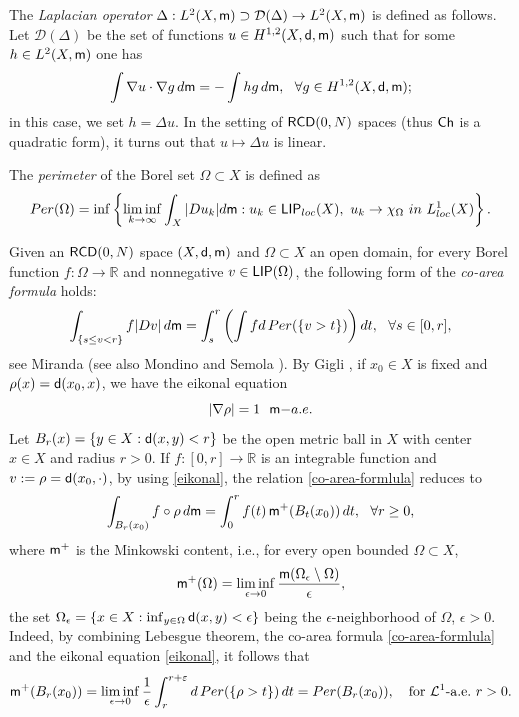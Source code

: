 \documentclass[11pt, reqno]{amsart}
\numberwithin{equation}{section}
\begin{document}
	The \textit{Laplacian operator} $\Delta:L^2(X,{\sf m})\supset \mathcal D(\Delta) \to L^2(X,{\sf m})$ is defined as follows. Let $\mathcal D(\Delta)$ be the set of functions $u\in H^{ 1,2}(X,{\sf d},{\sf m})$ such that for some $h\in L^2(X,{\sf m})$ one has 
	$$\int \nabla u \cdot \nabla g \, {\rm d}{\sf m}=-\int    hg \, {\rm d}{\sf m},\ \ \forall g\in H^{ 1,2}(X,{\sf d},{\sf m});$$ in this case, we set $h=\Delta u.$ In the setting of  ${\sf RCD}(0,N)$ spaces (thus ${\sf Ch}$ is a  quadratic form), it turns out that $u\mapsto \Delta u$ is linear. 
	
 The \textit{perimeter} of the Borel set $\Omega\subset X$ is defined as 
	$${\rm Per}(\Omega)=\inf\left\{\liminf_{k\to \infty} \int_X |D u_k| {\rm d} {\sf m}:u_k\in \mathsf{LIP}_{\rm loc}(X),\ u_k\to\chi_\Omega\ {\rm in}\ L^1_{\rm loc}(X) \right\}.$$
 
	Given an ${\sf RCD}(0,N)$ space $(X,{\sf d},{\sf m})$ and $\Omega\subset X$ an open domain, for every Borel function $f:\Omega\to \mathbb R$ and nonnegative $v\in {\sf LIP}(\Omega)$, the following form of the \textit{co-area formula} holds: 
	\begin{equation}\label{co-area-formlula}
		\int_{\{s\leq v<r\}}f|Dv|\,{\rm d}{\sf m}= \int_s^r\left(\int f {\rm d}\,{\rm Per}(\{v>t\})\right){\rm d}t,\ \ \forall s\in [0,r],
	\end{equation} see Miranda \cite[Proposition 4.2 \& Remark 4.3]{Miranda} (see also Mondino and Semola \cite[Corollary 2.13]{MSemola}). By Gigli \cite[Theorem 5.3]{Gigli1}, if $x_0\in X$ is fixed and $\rho(x)={\sf d}(x_0,x)$,  we have the eikonal equation
\begin{equation}\label{eikonal}
	|\nabla \rho|=1\ \ {\sf m}{\rm -a.e.}
\end{equation}
Let $B_r(x)=\{y\in X: {\sf d}(x,y)<r\}$ be  the open metric ball in $X$  with center $x\in X$ and radius $r>0.$  If $f:[0,r]\to \mathbb R$ is an integrable function and $v:=\rho={\sf d}(x_0,\cdot)$, by using \eqref{eikonal}, the relation  \eqref{co-area-formlula} reduces to
 	\begin{equation}\label{area-formlula}
 	\int_{B_r(x_0)}f\circ \rho\,{\rm d}{\sf m}= \int_0^r f(t)\, {\sf m}^+(B_t(x_0))\,  {\rm d}t,\ \ \forall r\geq 0,
 \end{equation}
where  ${\sf m}^+$ is the Minkowski content, i.e., for every open bounded $\Omega\subset X$, 
$${\sf m}^+(\Omega)=\liminf_{\epsilon\to 0}\frac{{\sf m}(\Omega_\epsilon\setminus\Omega)}{\epsilon},$$
the set  $\Omega_\epsilon=\{x\in X:\inf_{y\in \Omega}{\sf d}(x,y)<\epsilon\}$ being the $\epsilon$-neighborhood of $\Omega$, $\epsilon>0.$  Indeed, by combining Lebesgue theorem,  the co-area formula \eqref{co-area-formlula} and the eikonal equation \eqref{eikonal}, it follows that
\begin{equation}\label{eq:m+=PerBall}
{\sf m}^+(B_r(x_0))=\liminf_{\epsilon\to 0}\frac{1}{\epsilon} \int_r^{r+\varepsilon} {\rm d}\,{\rm Per}(\{\rho>t\})\, {\rm d}t= {\rm Per}(B_r(x_0)), \quad \text{for $\mathcal L^1$-a.e.}\ r>0.
\end{equation}
\end{document}
